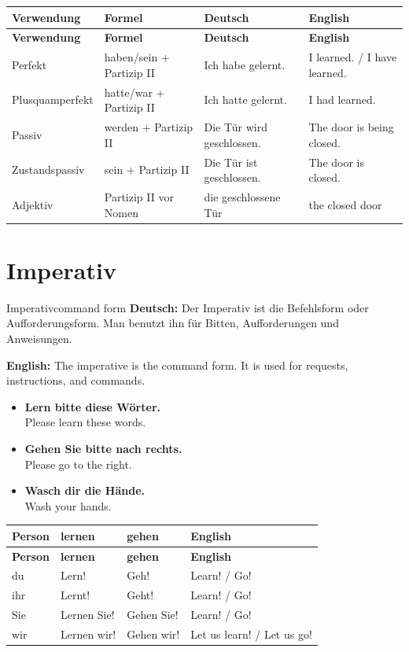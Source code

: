 \documentclass[a4paper,11pt]{article}
\newcommand{\GermanText}[1]{\textbf{Deutsch: }#1\par}
\newcommand{\EnglishText}[1]{{\small\color{SoftGray}\textbf{English: }#1\par}}
\newcommand{\ExampleItem}[2]{\item \textbf{#1}\\{\small\color{SoftGray}#2}}
\begin{document}
\begin{longtable}{L{3.2cm}L{4.2cm}L{4.2cm}L{4.2cm}}
\color{white}\textbf{Verwendung} & \color{white}\textbf{Formel} & \color{white}\textbf{Deutsch} & \color{white}\textbf{English} \\
\endfirsthead
{}
\color{white}\textbf{Verwendung} & \color{white}\textbf{Formel} & \color{white}\textbf{Deutsch} & \color{white}\textbf{English} \\
\endhead
Perfekt & haben/sein + Partizip II & Ich habe gelernt. & I learned. / I have learned. \\
Plusquamperfekt & hatte/war + Partizip II & Ich hatte gelernt. & I had learned. \\
Passiv & werden + Partizip II & Die Tür wird geschlossen. & The door is being closed. \\
Zustandspassiv & sein + Partizip II & Die Tür ist geschlossen. & The door is closed. \\
Adjektiv & Partizip II vor Nomen & die geschlossene Tür & the closed door \\
\end{longtable}

\section{Imperativ}

\begin{grammarentry}{Imperativ}{command form}
\GermanText{Der Imperativ ist die Befehlsform oder Aufforderungsform. Man benutzt ihn für Bitten, Aufforderungen und Anweisungen.}
\EnglishText{The imperative is the command form. It is used for requests, instructions, and commands.}

\begin{exbox}
\begin{itemize}
    \ExampleItem{Lern bitte diese Wörter.}{Please learn these words.}
    \ExampleItem{Gehen Sie bitte nach rechts.}{Please go to the right.}
    \ExampleItem{Wasch dir die Hände.}{Wash your hands.}
\end{itemize}
\end{exbox}
\end{grammarentry}

\begin{longtable}{L{3cm}L{4cm}L{4cm}L{4cm}}
\color{white}\textbf{Person} & \color{white}\textbf{lernen} & \color{white}\textbf{gehen} & \color{white}\textbf{English} \\
\endfirsthead
{}
\color{white}\textbf{Person} & \color{white}\textbf{lernen} & \color{white}\textbf{gehen} & \color{white}\textbf{English} \\
\endhead
du & Lern! & Geh! & Learn! / Go! \\
ihr & Lernt! & Geht! & Learn! / Go! \\
Sie & Lernen Sie! & Gehen Sie! & Learn! / Go! \\
wir & Lernen wir! & Gehen wir! & Let us learn! / Let us go! \\
\end{longtable}
\end{document}
